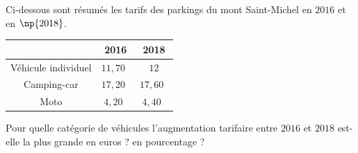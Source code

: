 \begin{exo}{}
	Ci-dessous sont résumés les tarifs des parkings du mont Saint-Michel en $2016$ et en $\np{2018}$.


	\begin{center}
		\def\arraystretch{1.5}
		\begin{tabular}{|c|c|c|} \hline
			                                       & \cellcolor{gray!30}2016 & \cellcolor{gray!30}2018 \\ \hline
			\cellcolor{gray!30}Véhicule individuel & $11,70$~\eur{}          & $12$\eur{}              \\ \hline
			\cellcolor{gray!30}Camping-car         & $17,20$~\eur{}          & $17,60$~\eur{}          \\ \hline
			\cellcolor{gray!30}Moto                & $4,20$~\eur{}           & $4,40$~\eur{}           \\ \hline
		\end{tabular}
	\end{center}


	Pour quelle catégorie de véhicules l'augmentation tarifaire entre $2016$ et $2018$ est-elle la plus grande en euros ? en pourcentage ?
\end{exo}
